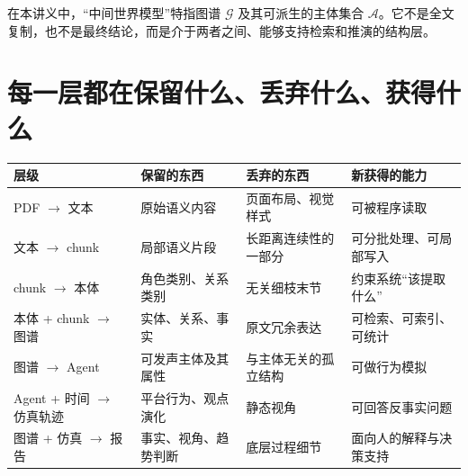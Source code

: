 \documentclass[UTF8,10pt,oneside]{ctexbook}
\begin{document}
\begin{definitionbox}[中间世界模型]
在本讲义中，“中间世界模型”特指图谱 \(\mathcal{G}\) 及其可派生的主体集合 \(\mathcal{A}\)。它不是全文复制，也不是最终结论，而是介于两者之间、能够支持检索和推演的结构层。
\end{definitionbox}

\section{每一层都在保留什么、丢弃什么、获得什么}

\begin{longtable}{p{2.2cm}p{3.6cm}p{3.6cm}p{4.2cm}}
\toprule
层级 & 保留的东西 & 丢弃的东西 & 新获得的能力 \\
\midrule
PDF $\rightarrow$ 文本 & 原始语义内容 & 页面布局、视觉样式 & 可被程序读取 \\
文本 $\rightarrow$ chunk & 局部语义片段 & 长距离连续性的一部分 & 可分批处理、可局部写入 \\
chunk $\rightarrow$ 本体 & 角色类别、关系类别 & 无关细枝末节 & 约束系统“该提取什么” \\
本体 + chunk $\rightarrow$ 图谱 & 实体、关系、事实 & 原文冗余表达 & 可检索、可索引、可统计 \\
图谱 $\rightarrow$ Agent & 可发声主体及其属性 & 与主体无关的孤立结构 & 可做行为模拟 \\
Agent + 时间 $\rightarrow$ 仿真轨迹 & 平台行为、观点演化 & 静态视角 & 可回答反事实问题 \\
图谱 + 仿真 $\rightarrow$ 报告 & 事实、视角、趋势判断 & 底层过程细节 & 面向人的解释与决策支持 \\
\bottomrule
\end{longtable}
\end{document}
